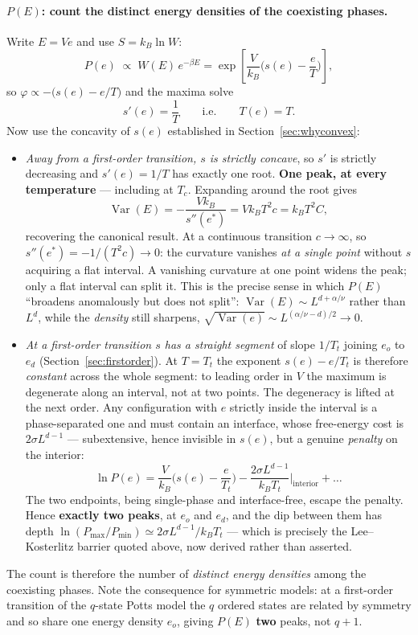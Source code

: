 \documentclass[10pt,a4paper]{article}
\theoremstyle{remark}
\newcommand{\Var}{\operatorname{Var}}
\begin{document}
\paragraph{$P(E)$: count the distinct energy densities of the coexisting phases.}
Write $E=Ve$ and use $S=k_B\ln W$:
\[
P(e)\;\propto\;W(E)\,e^{-\beta E}
=\exp\left[\frac{V}{k_B}\Big(s(e)-\frac{e}{T}\Big)\right],
\]
so $\varphi\propto -\big(s(e)-e/T\big)$ and the maxima solve
\[
s'(e)=\frac{1}{T}
\qquad\text{i.e.}\qquad
T(e)=T .
\]
Now use the concavity of $s(e)$ established in Section~\ref{sec:whyconvex}:
\begin{itemize}
\item \emph{Away from a first-order transition, $s$ is strictly concave}, so $s'$
is strictly decreasing and $s'(e)=1/T$ has exactly one root. \textbf{One peak, at
every temperature} --- including at $T_c$. Expanding around the root gives
\[
\Var(E)=-\frac{Vk_B}{s''(e^{\ast})}=Vk_BT^{2}c=k_BT^{2}C ,
\]
recovering the canonical result. At a continuous transition $c\to\infty$, so
$s''(e^{\ast})=-1/(T^{2}c)\to0$: the curvature vanishes \emph{at a single point}
without $s$ acquiring a flat interval. A vanishing curvature at one point widens
the peak; only a flat interval can split it. This is the precise sense in which
$P(E)$ ``broadens anomalously but does not split'': $\Var(E)\sim
L^{d+\alpha/\nu}$ rather than $L^{d}$, while the \emph{density} still sharpens,
$\sqrt{\Var(e)}\sim L^{(\alpha/\nu-d)/2}\to0$.
\item \emph{At a first-order transition $s$ has a straight segment} of slope
$1/T_t$ joining $e_o$ to $e_d$ (Section~\ref{sec:firstorder}). At $T=T_t$ the
exponent $s(e)-e/T_t$ is therefore \emph{constant} across the whole segment: to
leading order in $V$ the maximum is degenerate along an interval, not at two
points. The degeneracy is lifted at the next order. Any configuration with $e$
strictly inside the interval is a phase-separated one and must contain an
interface, whose free-energy cost is $2\sigma L^{d-1}$ --- subextensive, hence
invisible in $s(e)$, but a genuine \emph{penalty} on the interior:
\[
\ln P(e)=\frac{V}{k_B}\Big(s(e)-\frac{e}{T_t}\Big)
-\frac{2\sigma L^{d-1}}{k_BT_t}\Big|_{\text{interior}}+\dots
\]
The two endpoints, being single-phase and interface-free, escape the penalty.
Hence \textbf{exactly two peaks}, at $e_o$ and $e_d$, and the dip between them has
depth $\ln(P_{\max}/P_{\min})\simeq2\sigma L^{d-1}/k_BT_t$ --- which is precisely
the Lee--Kosterlitz barrier quoted above, now derived rather than asserted.
\end{itemize}
The count is therefore the number of \emph{distinct energy densities} among the
coexisting phases. Note the consequence for symmetric models: at a first-order
transition of the $q$-state Potts model the $q$ ordered states are related by
symmetry and so share one energy density $e_o$, giving $P(E)$ \textbf{two} peaks,
not $q+1$.
\end{document}
